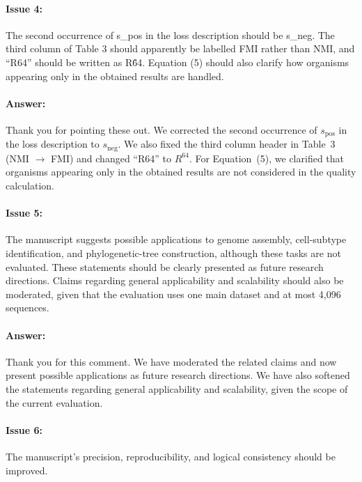 \documentclass{article}
\begin{document}
\paragraph{Issue 4:}
\begin{displayquote}
The second occurrence of s\_pos in the loss description should be s\_neg. The third column of Table 3 should apparently be labelled FMI rather than NMI, and “R64” should be written as R\^64. Equation (5) should also clarify how organisms appearing only in the obtained results are handled.
\end{displayquote}

\paragraph{Answer:}
Thank you for pointing these out. 
We corrected the second occurrence of $s_{\mathrm{pos}}$ in the loss description to $s_{\mathrm{neg}}$.
We also fixed the third column header in Table~3 (NMI $\to$ FMI) and changed ``R64'' to $R^{64}$. 
For Equation~(5), we clarified that organisms appearing only in the obtained results are not considered in the quality calculation.


\paragraph{Issue 5:}
\begin{displayquote}
The manuscript suggests possible applications to genome assembly, cell-subtype identification, and phylogenetic-tree construction, although these tasks are not evaluated. These statements should be clearly presented as future research directions. Claims regarding general applicability and scalability should also be moderated, given that the evaluation uses one main dataset and at most 4,096 sequences.
\end{displayquote}

\paragraph{Answer:}
Thank you for this comment.
We have moderated the related claims and now present possible applications as future research directions.
We have also softened the statements regarding general applicability and scalability, given the scope of the current evaluation.


\paragraph{Issue 6:}
\begin{displayquote}
The manuscript’s precision, reproducibility, and logical consistency should be improved.
\end{displayquote}
\end{document}
